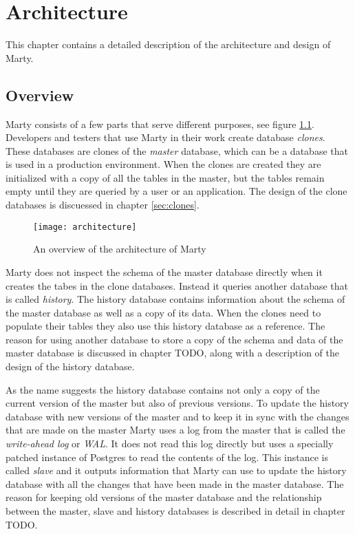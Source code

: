 \chapter{Architecture}
This chapter contains a detailed description of the architecture and design of Marty.

\section{Overview}
Marty consists of a few parts that serve different purposes, see figure \ref{architecture-overview}.
Developers and testers that use Marty in their work create database \textit{clones}.
These databases are clones of the \textit{master} database, which can be a database that is used in a production environment.
When the clones are created they are initialized with a copy of all the tables in the master, but the tables remain empty until they are queried by a user or an application.
The design of the clone databases is discuessed in chapter \ref{sec:clones}.

\begin{figure}[h!]
  \centering
    \texttt{[image: architecture]}
  \caption{An overview of the architecture of Marty}
  \label{architecture-overview}
\end{figure}

Marty does not inspect the schema of the master database directly when it creates the tabes in the clone databases.
Instead it queries another database that is called \textit{history}.
The history database contains information about the schema of the master database as well as a copy of its data.
When the clones need to populate their tables they also use this history database as a reference.
The reason for using another database to store a copy of the schema and data of the master database is discussed in chapter TODO, along with a description of the design of the history database.

As the name suggests the history database contains not only a copy of the current version of the master but also of previous versions.
To update the history database with new versions of the master and to keep it in sync with the changes that are made on the master Marty uses a log from the master that is called the \textit{write-ahead log} or \textit{WAL}.
It does not read this log directly but uses a specially patched instance of Postgres to read the contents of the log.
This instance is called \textit{slave} and it outputs information that Marty can use to update the history database with all the changes that have been made in the master database.
The reason for keeping old versions of the master database and the relationship between the master, slave and history databases is described in detail in chapter TODO.

